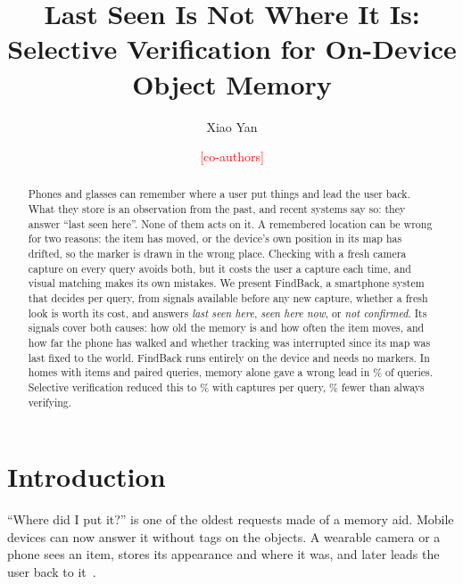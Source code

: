 \documentclass[sigconf,10pt]{acmart}
\newcommand{\todo}[1]{\textcolor{red}{[#1]}}
\newcommand{\sys}{FindBack}
\begin{document}
\title{Last Seen Is Not Where It Is: Selective Verification for On-Device Object Memory}

\author{Xiao Yan}
\affiliation{\institution{\todo{affiliation}}\country{USA}}
\author{\todo{co-authors}}
\affiliation{\institution{\todo{affiliation}}\country{USA}}

\begin{abstract}
Phones and glasses can remember where a user put things and lead the user back.
What they store is an observation from the past, and recent systems say so: they answer
``last seen here''.
None of them acts on it.
A remembered location can be wrong for two reasons: the item has moved, or the device's own
position in its map has drifted, so the marker is drawn in the wrong place.
Checking with a fresh camera capture on every query avoids both, but it costs the user a capture
each time, and visual matching makes its own mistakes.
We present \sys{}, a smartphone system that decides per query, from signals available before any
new capture, whether a fresh look is worth its cost, and answers \emph{last seen here},
\emph{seen here now}, or \emph{not confirmed}.
Its signals cover both causes: how old the memory is and how often the item moves, and how far the
phone has walked and whether tracking was interrupted since its map was last fixed to the world.
\sys{} runs entirely on the device and needs no markers.
In \NSites{} homes with \NItems{} items and \NQueriesPaired{} paired queries, memory alone gave a
wrong lead in \WrongLeadMemoryPct{}\% of queries.
Selective verification reduced this to \WrongLeadSelectivePct{}\% with \CapturesSelective{}
captures per query, \CaptureSavingPct{}\% fewer than always verifying.
\end{abstract}

\maketitle

\section{Introduction}

``Where did I put it?'' is one of the oldest requests made of a memory aid.
Mobile devices can now answer it without tags on the objects.
A wearable camera or a phone sees an item, stores its appearance and where it was, and later
leads the user back to it~\cite{yagi2021gofinder,morrison2023findmythings,maniar2025mempal}.
\end{document}
